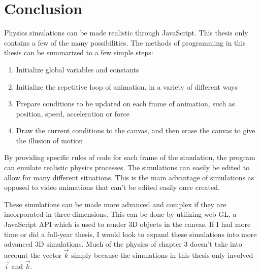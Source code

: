 
\chapter{Conclusion} %

\label{Conclusion} %



Physics simulations can be made realistic through JavaScript.  This thesis only contains a few of the many possibilities.  The methods of programming in this thesis can be summarized to a few simple steps:

\begin{enumerate}  
\item Initialize global variables and constants
\item Initialize the repetitive loop of animation, in a variety of different ways
\item Prepare conditions to be updated on each frame of animation, such as position, speed, acceleration or force
\item Draw the current conditions to the canvas, and then erase the canvas to give the illusion of motion
\end{enumerate} 

By providing specific rules of code for each frame of the simulation, the program can emulate realistic physics processes.  The simulations can easily be edited to allow for many different situations.  This is the main advantage of simulations as opposed to video animations that can't be edited easily once created.     


These simulations can be made more advanced and complex if they are incorporated in three dimensions.  This can be done by utilizing web GL, a JavaScript API which is used to render 3D objects in the canvas.  If I had more time or did a full-year thesis, I would look to expand these simulations into more advanced 3D simulations.  Much of the physics of chapter 3 doesn't take into account the vector $\vec{k}$ simply because the simulations in this thesis only involved $\vec{i}$ and $\vec{k}$.  


